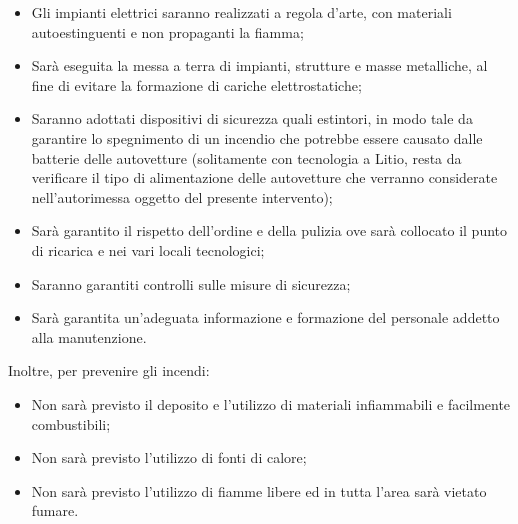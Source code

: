 \begin{itemize}
\item Gli impianti elettrici saranno realizzati a regola d'arte, con materiali autoestinguenti e non propaganti la fiamma;
\item Sarà eseguita la messa a terra di impianti, strutture e masse metalliche, al fine di evitare la formazione di cariche elettrostatiche;
\item Saranno adottati dispositivi di sicurezza quali estintori, in modo tale da garantire lo spegnimento di un incendio che potrebbe essere causato dalle batterie delle autovetture (solitamente con tecnologia a Litio, resta da verificare il tipo di alimentazione delle autovetture che verranno considerate nell'autorimessa oggetto del presente intervento);
\item Sarà garantito il rispetto dell'ordine e della pulizia ove sarà collocato il punto di ricarica e nei vari locali tecnologici;
\item Saranno garantiti controlli sulle misure di sicurezza;
\item Sarà garantita un'adeguata informazione e formazione del personale addetto alla manutenzione.
\end{itemize}

Inoltre, per prevenire gli incendi:

\begin{itemize}
\item Non sarà previsto il deposito e l'utilizzo di materiali infiammabili e facilmente combustibili;
\item Non sarà previsto l'utilizzo di fonti di calore;
\item Non sarà previsto l'utilizzo di fiamme libere ed in tutta l'area sarà vietato fumare.
\end{itemize}

